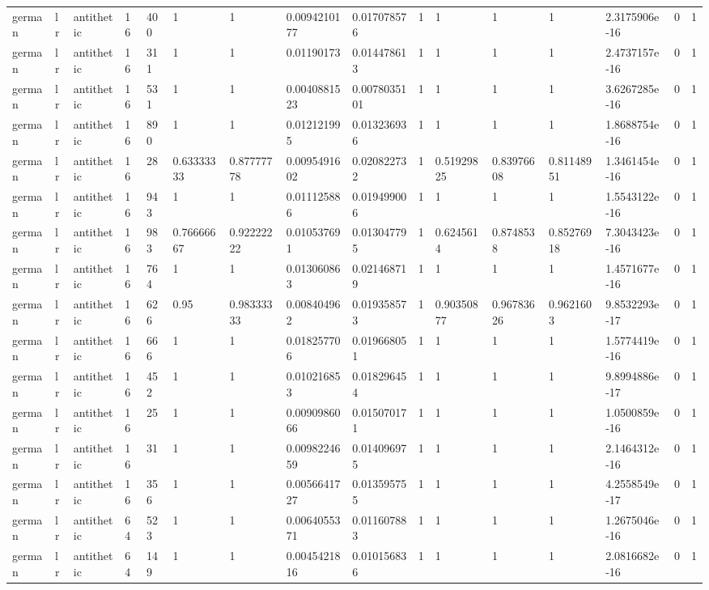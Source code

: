 \begin{tabular}{llllllllllllllll}
german & lr & antithetic & 16 & 400 & 1 & 1 & 0.0094210177 & 0.017078576 & 1 & 1 & 1 & 1 & 2.3175906e-16 & 0 & 1 \\
german & lr & antithetic & 16 & 311 & 1 & 1 & 0.01190173 & 0.014478613 & 1 & 1 & 1 & 1 & 2.4737157e-16 & 0 & 1 \\
german & lr & antithetic & 16 & 531 & 1 & 1 & 0.0040881523 & 0.0078035101 & 1 & 1 & 1 & 1 & 3.6267285e-16 & 0 & 1 \\
german & lr & antithetic & 16 & 890 & 1 & 1 & 0.012121995 & 0.013236936 & 1 & 1 & 1 & 1 & 1.8688754e-16 & 0 & 1 \\
german & lr & antithetic & 16 & 28 & 0.63333333 & 0.87777778 & 0.0095491602 & 0.020822732 & 1 & 0.51929825 & 0.83976608 & 0.81148951 & 1.3461454e-16 & 0 & 1 \\
german & lr & antithetic & 16 & 943 & 1 & 1 & 0.011125886 & 0.019499006 & 1 & 1 & 1 & 1 & 1.5543122e-16 & 0 & 1 \\
german & lr & antithetic & 16 & 983 & 0.76666667 & 0.92222222 & 0.010537691 & 0.013047795 & 1 & 0.6245614 & 0.8748538 & 0.85276918 & 7.3043423e-16 & 0 & 1 \\
german & lr & antithetic & 16 & 764 & 1 & 1 & 0.013060863 & 0.021468719 & 1 & 1 & 1 & 1 & 1.4571677e-16 & 0 & 1 \\
german & lr & antithetic & 16 & 626 & 0.95 & 0.98333333 & 0.008404962 & 0.019358573 & 1 & 0.90350877 & 0.96783626 & 0.9621603 & 9.8532293e-17 & 0 & 1 \\
german & lr & antithetic & 16 & 666 & 1 & 1 & 0.018257706 & 0.019668051 & 1 & 1 & 1 & 1 & 1.5774419e-16 & 0 & 1 \\
german & lr & antithetic & 16 & 452 & 1 & 1 & 0.010216853 & 0.018296454 & 1 & 1 & 1 & 1 & 9.8994886e-17 & 0 & 1 \\
german & lr & antithetic & 16 & 25 & 1 & 1 & 0.0090986066 & 0.015070171 & 1 & 1 & 1 & 1 & 1.0500859e-16 & 0 & 1 \\
german & lr & antithetic & 16 & 31 & 1 & 1 & 0.0098224659 & 0.014096975 & 1 & 1 & 1 & 1 & 2.1464312e-16 & 0 & 1 \\
german & lr & antithetic & 16 & 356 & 1 & 1 & 0.0056641727 & 0.013595755 & 1 & 1 & 1 & 1 & 4.2558549e-17 & 0 & 1 \\
german & lr & antithetic & 64 & 523 & 1 & 1 & 0.0064055371 & 0.011607883 & 1 & 1 & 1 & 1 & 1.2675046e-16 & 0 & 1 \\
german & lr & antithetic & 64 & 149 & 1 & 1 & 0.0045421816 & 0.010156836 & 1 & 1 & 1 & 1 & 2.0816682e-16 & 0 & 1 \\

\end{tabular}
